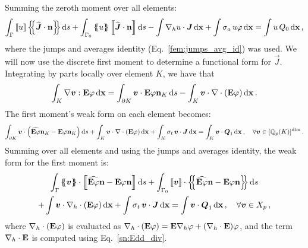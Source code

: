 \documentclass[../doc.tex]{subfiles}
\begin{document}
Summing the zeroth moment over all elements: 
	\begin{equation}
		\int_\Gamma \jump{u} \avg{\widehat{\vec{J}}\cdot\n} \ud s + \int_{\Gamma_0} \avg{u}\jump{\widehat{\vec{J}}\cdot\n} \ud s - \int \nablah u \cdot \vec{J} \ud \x + \int \sigma_a \, u\varphi \ud \x = \int u\, Q_0 \ud \x \,,
	\end{equation}
where the jumps and averages identity (Eq.~\ref{fem:jumps_avg_id}) was used. We will now use the discrete first moment to determine a functional form for $\vec{J}$. Integrating by parts locally over element $K$, we have that 
	\begin{equation} \label{dgvef:identity}
		\int_K \nabla\boldsymbol{v} : \boldsymbol{\mathrm{E}} \varphi \mathop{}\!\mathrm{d} \boldsymbol{\mathrm{x}} = \int_{\partial K} \boldsymbol{v}\cdot\boldsymbol{\mathrm{E}}\varphi\boldsymbol{\mathrm{n}}_K \mathop{}\!\mathrm{d} s - \int_K \boldsymbol{v}\cdot\nabla\cdot\left( \boldsymbol{\mathrm{E}}\varphi \right) \mathop{}\!\mathrm{d} \boldsymbol{\mathrm{x}} \,. 
	\end{equation}
The first moment's weak form on each element becomes: 
	\begin{equation}
		\int_{\partial K} \boldsymbol{v}\cdot\left( \widehat{\boldsymbol{\mathrm{E}}\varphi}\boldsymbol{\mathrm{n}}_K - \boldsymbol{\mathrm{E}}\varphi\boldsymbol{\mathrm{n}}_K \right) \mathop{}\!\mathrm{d} s + \int_K \boldsymbol{v}\cdot\nabla\cdot\left( \boldsymbol{\mathrm{E}}\varphi \right) \mathop{}\!\mathrm{d} \boldsymbol{\mathrm{x}} + \int_K \sigma_t \, \boldsymbol{v}\cdot\boldsymbol{J} \mathop{}\!\mathrm{d} \boldsymbol{\mathrm{x}} = \int_K \boldsymbol{v} \cdot\boldsymbol{Q}_1 \mathop{}\!\mathrm{d} \boldsymbol{\mathrm{x}} \,, \quad \forall \boldsymbol{v} \in [\mathbb{Q}_p(K)]^{\dim} \,. 
	\end{equation}
Summing over all elements and using the jumps and averages identity, the weak form for the first moment is:  
	\begin{multline} \label{dgvef:weak_strong}
		\int_\Gamma \avg{\vec{v}}\cdot\jump{\widehat{\E\varphi}\n - \E\varphi\n} \ud s + \int_{\Gamma_0} \jump{\vec{v}} \cdot \avg{\widehat{\E\varphi}\n - \E\varphi\n} \ud s \\+ \int \vec{v}\cdot\nablah \cdot\paren{\E\varphi} \ud \x + \int \sigma_t \, \vec{v}\cdot\vec{J} \ud \x = \int \vec{v}\cdot\vec{Q}_1 \ud \x \,, \quad \forall \vec{v} \in \vDG \,, 
	\end{multline}
where $\nabla_h\cdot\left( \boldsymbol{\mathrm{E}}\varphi \right)$ is evaluated as $\nabla_h\cdot\left( \boldsymbol{\mathrm{E}}\varphi \right) = \boldsymbol{\mathrm{E}}\nabla_h \varphi + \left( \nabla_h\cdot\boldsymbol{\mathrm{E}} \right)\!\varphi$, and the term $\nabla_h\cdot\boldsymbol{\mathrm{E}}$ is computed using Eq.~\ref{sn:Edd_div}. 
\end{document}
